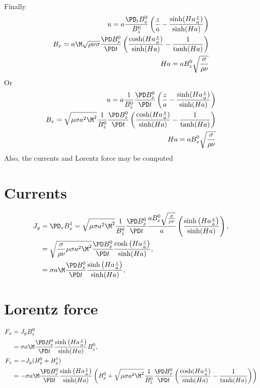 \documentclass[11pt]{article}
\begin{document}
Finally
\begin{equation}\begin{aligned}
u   = a \frac{\PD_t B_x^0}{ B_z^0} \left( \frac{z}{a} - \frac{\sinh(Ha \frac{z}{a})}{\sinh(Ha)} \right) \\
B_x = a \M \sqrt{\rho \nu \sigma}  \frac{\PD B_x^0}{\PD t} \left( \frac{\cosh(Ha \frac{z}{a})}{\sinh(Ha)} - \frac{1}{\tanh(Ha)} \right) \\
Ha = a B_z^0 \sqrt{\frac{\sigma}{\rho \nu}} \\
\end{aligned} \end{equation}
Or
\begin{equation}\begin{aligned}
u   = a \frac{1}{B_z^0} \frac{\PD B_x^0}{\PD t}  \left( \frac{z}{a} - \frac{\sinh(Ha \frac{z}{a})}{\sinh(Ha)} \right) \\
B_x = \sqrt{\mu \sigma a^2 \M^2} \frac{1}{B_z^0} \frac{\PD B_x^0}{\PD t} \left( \frac{\cosh(Ha \frac{z}{a})}{\sinh(Ha)} - \frac{1}{\tanh(Ha)} \right) \\
Ha = a B_z^0 \sqrt{\frac{\sigma}{\rho \nu}} \\
\end{aligned} \end{equation}
Also, the currents and Lorentz force may be computed
\section{Currents}
\begin{equation}\begin{aligned}
J_y &= \PD_z B_x^1 = \sqrt{\mu \sigma a^2 \M^2} \frac{1}{B_z^0} \frac{\PD B_x^0}{\PD t} \frac{a B_z^0 \sqrt{\frac{\sigma}{\rho \nu}}}{a} \left( \frac{\sinh \left(Ha \frac{z}{a} \right)}{\sinh(Ha)}\right), \\
    & = \sqrt{\frac{\sigma}{\rho \nu} \mu \sigma a^2 \M^2} \frac{\PD B_x^0}{\PD t} \frac{\cosh \left(Ha \frac{z}{a} \right)}{\sinh(Ha)}, \\
    &= \sigma a \M \frac{\PD B_x^0}{\PD t} \frac{\sinh \left(Ha \frac{z}{a} \right)}{\sinh(Ha)}, \\
\end{aligned} \end{equation}

\section{Lorentz force}
\begin{equation}\begin{aligned}
F_x & = J_y B_z^0 \\
&= \sigma a \M \frac{\PD B_x^0}{\PD t} \frac{\sinh \left(Ha \frac{z}{a} \right)}{\sinh(Ha)} B_z^0, \\
F_z & = - J_y (B_x^0 + B_x^1) \\
& = - \sigma a \M \frac{\PD B_x^0}{\PD t} \frac{\sinh \left(Ha \frac{z}{a} \right)}{\sinh(Ha)} \left(B_x^0 + \sqrt{\mu \sigma a^2 \M^2} \frac{1}{B_z^0} \frac{\PD B_x^0}{\PD t} \left( \frac{\cosh(Ha \frac{z}{a})}{\sinh(Ha)} - \frac{1}{\tanh(Ha)} \right) \right) \\
\end{aligned} \end{equation}
\end{document}

